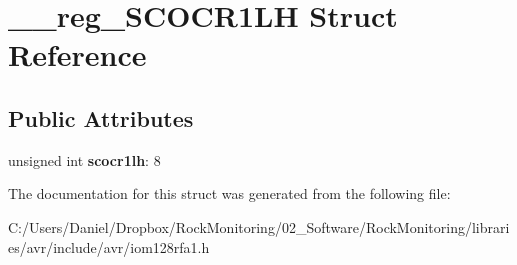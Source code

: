 \hypertarget{struct____reg___s_c_o_c_r1_l_h}{}\section{\+\_\+\+\_\+reg\+\_\+\+S\+C\+O\+C\+R1\+LH Struct Reference}
\label{struct____reg___s_c_o_c_r1_l_h}
\subsection*{Public Attributes}
\begin{DoxyCompactItemize}
\item 
unsigned int {\bfseries scocr1lh}\+: 8\hypertarget{struct____reg___s_c_o_c_r1_l_h_ad79e8fcc8a32e0833a03ccc5e2126b70}{}\label{struct____reg___s_c_o_c_r1_l_h_ad79e8fcc8a32e0833a03ccc5e2126b70}

\end{DoxyCompactItemize}


The documentation for this struct was generated from the following file\+:\begin{DoxyCompactItemize}
\item 
C\+:/\+Users/\+Daniel/\+Dropbox/\+Rock\+Monitoring/02\+\_\+\+Software/\+Rock\+Monitoring/libraries/avr/include/avr/iom128rfa1.\+h\end{DoxyCompactItemize}
